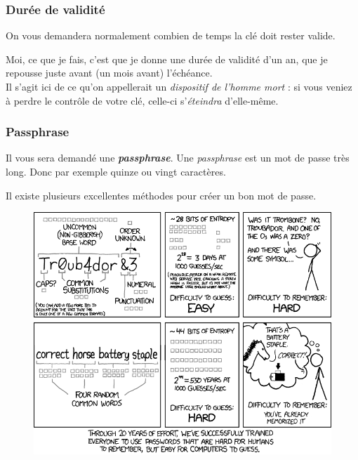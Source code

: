 \subsubsection{Durée de validité}\label{duruxe9e-de-validituxe9}

On vous demandera normalement combien de temps la clé doit rester
valide.

Moi, ce que je fais, c'est que je donne une durée de validité d'un an,
que je repousse juste avant (un mois avant) l'échéance.\\Il s'agit ici
de ce qu'on appellerait un \emph{dispositif de l'homme mort} : si vous
veniez à perdre le contrôle de votre clé, celle-ci s'\emph{éteindra}
d'elle-même.

\subsubsection{Passphrase}\label{passphrase}

Il vous sera demandé une \textbf{\emph{passphrase}}. Une
\emph{passphrase} est un mot de passe très long. Donc par exemple quinze
ou vingt caractères.

Il existe plusieurs excellentes méthodes pour créer un bon mot de passe.

\begin{figure}[h]
\centering
\includegraphics[width=\linewidth]{./images/password_strength.png}
\caption[Recommandations pour un mot de passe fort, par XKCD (https://xkcd.com/936/)]{}
\end{figure}

